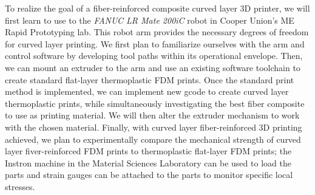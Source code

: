\documentclass[letter,10pt,english]{article}
\begin{document}

To realize the goal of a fiber-reinforced composite curved layer 3D printer, we will first learn to use to the \emph{FANUC LR Mate 200iC} robot in Cooper Union's ME Rapid Prototyping lab. This robot arm provides the necessary degrees of freedom for curved layer printing. We first plan to familiarize ourselves with the arm and control software by developing tool paths within its operational envelope. Then, we can mount an extruder to the arm and use an existing software toolchain to create standard flat-layer thermoplastic FDM prints. Once the standard print method is implemented, we can implement new gcode to create curved layer thermoplastic prints, while simultaneously investigating the best fiber composite to use as printing material. We will then alter the extruder mechanism to work with the chosen material. Finally, with curved layer fiber-reinforced 3D printing achieved, we plan to experimentally compare the mechanical strength of curved layer fiver-reinforced FDM prints to thermoplastic flat-layer FDM prints; the Instron machine in the Material Sciences Laboratory can be used to load the parts and strain gauges can be attached to the parts to monitor specific local stresses.

\end{document}
